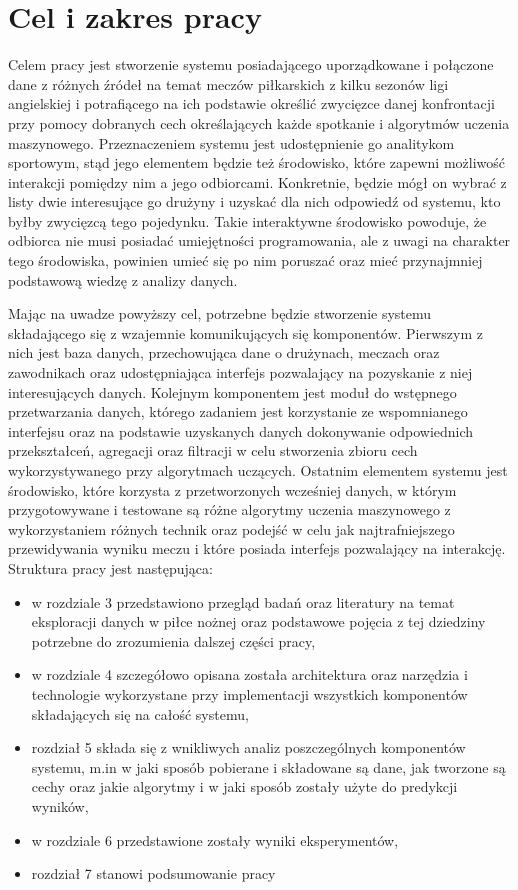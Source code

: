 \chapter{Cel i zakres pracy}

\noindent Celem pracy jest stworzenie systemu posiadającego uporządkowane i połączone dane z różnych źródeł na temat meczów piłkarskich z kilku sezonów ligi angielskiej i potrafiącego na ich podstawie określić zwycięzce danej konfrontacji przy pomocy dobranych cech określających każde spotkanie i algorytmów uczenia maszynowego. Przeznaczeniem systemu jest udostępnienie go analitykom sportowym, stąd jego elementem będzie też środowisko, które zapewni możliwość interakcji pomiędzy nim a jego odbiorcami. Konkretnie, będzie mógł on wybrać z listy dwie interesujące go drużyny i uzyskać dla nich odpowiedź od systemu, kto byłby zwycięzcą tego pojedynku. Takie interaktywne środowisko powoduje, że odbiorca nie musi posiadać umiejętności programowania, ale z uwagi na charakter tego środowiska, powinien umieć się po nim poruszać oraz mieć przynajmniej podstawową wiedzę z analizy danych.


Mając na uwadze powyższy cel, potrzebne będzie stworzenie systemu składającego się z wzajemnie komunikujących się komponentów. Pierwszym z nich jest baza danych, przechowująca dane o drużynach, meczach oraz zawodnikach oraz udostępniająca interfejs pozwalający na pozyskanie z niej interesujących danych. Kolejnym komponentem jest moduł do wstępnego przetwarzania danych, którego zadaniem jest korzystanie ze wspomnianego interfejsu oraz na podstawie uzyskanych danych dokonywanie odpowiednich przekształceń, agregacji oraz filtracji w celu stworzenia zbioru cech wykorzystywanego przy algorytmach uczących. Ostatnim elementem systemu jest środowisko, które korzysta z przetworzonych wcześniej danych, w którym przygotowywane i testowane są różne algorytmy uczenia maszynowego z wykorzystaniem różnych technik oraz podejść w celu jak najtrafniejszego przewidywania wyniku meczu i które posiada interfejs pozwalający na interakcję.
\\

\noindent Struktura pracy jest następująca:
\begin{itemize}
    \item w rozdziale 3 przedstawiono przegląd badań oraz literatury na temat eksploracji danych w piłce nożnej oraz podstawowe pojęcia z tej dziedziny potrzebne do zrozumienia dalszej części pracy,
    \item w rozdziale 4 szczegółowo opisana została architektura oraz narzędzia i technologie wykorzystane przy implementacji wszystkich komponentów składających się na całość systemu,
    \item rozdział 5 składa się z wnikliwych analiz poszczególnych komponentów systemu, m.in w jaki sposób pobierane i składowane są dane, jak tworzone są cechy oraz jakie algorytmy i w jaki sposób zostały użyte do predykcji wyników,
    \item w rozdziale 6 przedstawione zostały wyniki eksperymentów,
    \item rozdział 7 stanowi podsumowanie pracy
\end{itemize}


